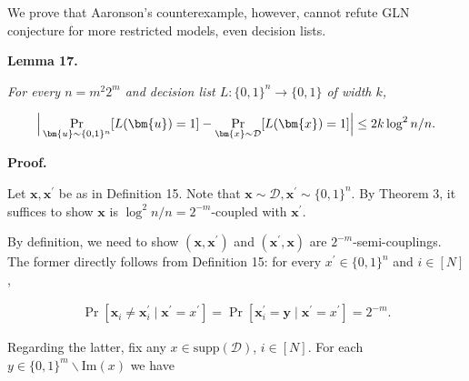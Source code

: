 \documentclass[10pt,a4paper]{article}
\begin{document}



We prove that Aaronson’s counterexample, however, cannot refute GLN conjecture for more restricted models, even decision lists.\par





\par\medskip\noindent\textbf{
\textbf{Lemma 17}\textbf{.}
}\par



\emph{For every $n=m^{2}2^{m}$ and decision list $L\colon\{0,1\}^{n}\to\{0,1\}$ of width $k$,}\par


\[\begin{gathered}
\Big{|}\Pr_{\bm{u}\sim\{0,1\}^{n}}[L(\bm{u})=1]-\Pr_{\bm{x}\sim\mathcal{D}}[L(\bm{x})=1]\Big{|}\leq 2k\log^{2}n/n.
\end{gathered}\]






\par\medskip\noindent\textbf{Proof.}\par




Let $\bm{x},\bm{x}^{\prime}$ be as in Definition 15.
Note that $\bm{x}\sim\mathcal{D},\bm{x}^{\prime}\sim\{0,1\}^{n}$.
By Theorem 3, it suffices to show $\bm{x}$ is $\log^{2}n/n=2^{-m}$-coupled with $\bm{x}^{\prime}$.\par




By definition, we need to show $(\bm{x},\bm{x}^{\prime})$ and $(\bm{x}^{\prime},\bm{x})$ are $2^{-m}$-semi-couplings.
The former directly follows from Definition 15:
for every $x^{\prime}\in\{0,1\}^{n}$ and $i\in[N]$,\par


\[\begin{gathered}
\Pr[\bm{x}_{i}\neq\bm{x}^{\prime}_{i}\mid\bm{x}^{\prime}=x^{\prime}]=\Pr[\bm{x}^{\prime}_{i}=\bm{y}\mid\bm{x}^{\prime}=x^{\prime}]=2^{-m}.
\end{gathered}\]


Regarding the latter, fix any $x\in\mathrm{supp}(\mathcal{D})$, $i\in[N]$.
For each $y\in\{0,1\}^{m}\smallsetminus\mathrm{Im}(x)$ we have\par
\end{document}
